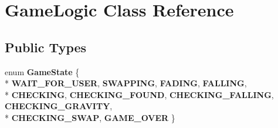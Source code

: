 \hypertarget{class_game_logic}{\section{Game\-Logic Class Reference}
\label{class_game_logic}
}
\subsection*{Public Types}
\begin{DoxyCompactItemize}
\item 
enum {\bfseries Game\-State} \{ \\*
{\bfseries W\-A\-I\-T\-\_\-\-F\-O\-R\-\_\-\-U\-S\-E\-R}, 
{\bfseries S\-W\-A\-P\-P\-I\-N\-G}, 
{\bfseries F\-A\-D\-I\-N\-G}, 
{\bfseries F\-A\-L\-L\-I\-N\-G}, 
\\*
{\bfseries C\-H\-E\-C\-K\-I\-N\-G}, 
{\bfseries C\-H\-E\-C\-K\-I\-N\-G\-\_\-\-F\-O\-U\-N\-D}, 
{\bfseries C\-H\-E\-C\-K\-I\-N\-G\-\_\-\-F\-A\-L\-L\-I\-N\-G}, 
{\bfseries C\-H\-E\-C\-K\-I\-N\-G\-\_\-\-G\-R\-A\-V\-I\-T\-Y}, 
\\*
{\bfseries C\-H\-E\-C\-K\-I\-N\-G\-\_\-\-S\-W\-A\-P}, 
{\bfseries G\-A\-M\-E\-\_\-\-O\-V\-E\-R}
 \}
\end{DoxyCompactItemize}
